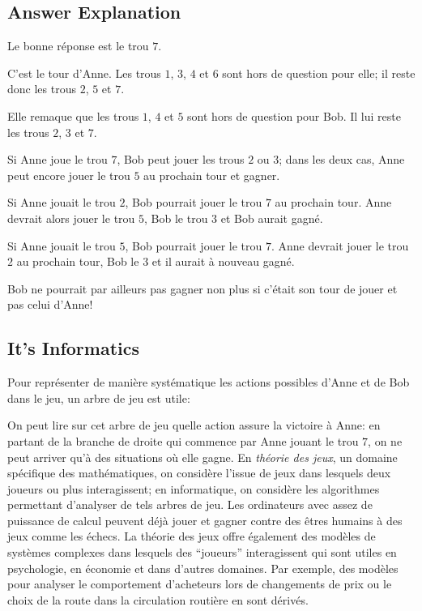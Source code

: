 \documentclass[a4paper,11pt]{report}
\newcommand{\taskGraphicsFolder}{..}
\begin{document}
\endgroup

\subsection*{Answer Explanation}

Le bonne réponse est le trou $7$.

{\centering%
\par}

C’est le tour d’Anne. Les trous $1$, $3$, $4$ et $6$ sont hors de question pour elle; il reste donc les trous $2$, $5$ et $7$.

{\centering%
\par}

Elle remaque que les trous $1$, $4$ et $5$ sont hors de question pour Bob. Il lui reste les trous $2$, $3$ et $7$.

Si Anne joue le trou $7$, Bob peut jouer les trous $2$ ou $3$; dans les deux cas, Anne peut encore jouer le trou $5$ au prochain tour et gagner.

Si Anne jouait le trou $2$, Bob pourrait jouer le trou $7$ au prochain tour. Anne devrait alors jouer le trou $5$, Bob le trou $3$ et Bob aurait gagné.

Si Anne jouait le trou $5$, Bob pourrait jouer le trou $7$. Anne devrait jouer le trou $2$ au prochain tour, Bob le $3$ et il aurait à nouveau gagné.

Bob ne pourrait par ailleurs pas gagner non plus si c’était son tour de jouer et pas celui d’Anne!


\subsection*{It’s Informatics}

Pour représenter de manière systématique les actions possibles d’Anne et de Bob dans le jeu, un arbre de jeu est utile:

{\centering%
\par}

On peut lire sur cet arbre de jeu quelle action assure la victoire à Anne: en partant de la branche de droite qui commence par Anne jouant le trou $7$, on ne peut arriver qu’à des situations où elle gagne. En \emph{théorie des jeux}, un domaine spécifique des mathématiques, on considère l’issue de jeux dans lesquels deux joueurs ou plus interagissent; en informatique, on considère les algorithmes permettant d’analyser de tels arbres de jeu. Les ordinateurs avec assez de puissance de calcul peuvent déjà jouer et gagner contre des êtres humains à des jeux comme les échecs. La théorie des jeux offre également des modèles de systèmes complexes dans lesquels des “joueurs” interagissent qui sont utiles en psychologie, en économie et dans d’autres domaines. Par exemple, des modèles pour analyser le comportement d’acheteurs lors de changements de prix ou le choix de la route dans la circulation routière en sont dérivés.
\end{document}
